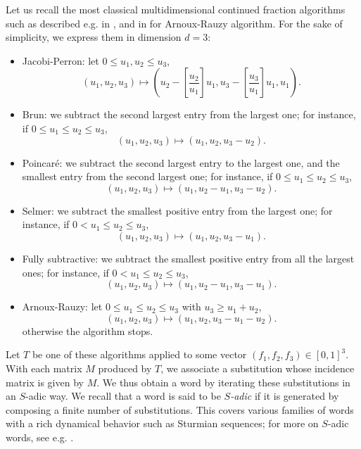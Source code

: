 \documentclass[preliminary,copyright,creativecommons]{eptcs}
\begin{document}
Let us  recall  the most classical multidimensional continued fraction algorithms      such    as  described e.g.  in \cite{schweiger}, and in \cite{CFZ,CFM,WZ} for Arnoux-Rauzy  algorithm.
For the sake of simplicity, we express them  in dimension $d=3$:
\begin{itemize}


\item   {Jacobi-Perron:}  let 
$0\leq u_1,u_2 \leq u_3$,
$$(u_1,u_2,u_3) \mapsto (u_2- [\frac{u_2}{u_1}] u_1, u_3- [\frac{u_3}{u_1}] u_1, u_1).$$
\item   {Brun: }
 we subtract the second largest entry from the largest one;   for instance, if  
   $0 \leq u_1\leq u_2 \leq u_3$,  
$$(u_1,u_2,u_3) \mapsto  (u_1, u_2, u_3 -u_2).$$


\item   {Poincar\'e:}  we subtract  the second largest entry to the largest one,  and   the smallest  entry  from the  second largest one; for instance, if 
$0 \leq u_1\leq u_2 \leq u_3$,
$$(u_1,u_2,u_3) \mapsto  (u_1, u_2-u_1, u_3 -u_2).$$


\item   {Selmer: }
 we subtract the smallest  positive entry   from the largest  one;   for instance, if   $0  < u_1\leq u_2 \leq u_3$,
$$(u_1,u_2,u_3) \mapsto  (u_1, u_2, u_3 -u_1).$$


\item   {Fully subtractive: }
we subtract the smallest   positive entry   from all  the largest  ones;   for instance, if 
  $0  <  u_1\leq u_2 \leq u_3$,
$$(u_1,u_2,u_3) \mapsto  (u_1, u_2-u_1, u_3 -u_1).$$

\item {Arnoux-Rauzy:}
let  $0 \leq u_1\leq u_2 \leq u_3$  with  $u_3 \geq u_1+u_2$,
$$(u_1,u_2,u_3) \mapsto  (u_1, u_2, u_3 -u_1 -u_2).$$
otherwise the algorithm stops.



\end{itemize}
Let $T$  be one of these   algorithms applied to  some vector $(f_1,f_2,f_3) \in [0,1]^3$.
With each matrix $M$ produced by  $T$, we associate  a substitution whose incidence matrix
is given by $M$.   We thus obtain a  word  by iterating these   substitutions in an $S$-adic way.
 We recall that a word  is said to be {\em  $S$-adic}  if it is generated by     composing   a  finite number of substitutions. This covers     various  families of  words
 with a rich   dynamical  behavior such as Sturmian sequences;  for more on $S$-adic words, see  e.g.  \cite{ABFogg,Durand}. 
 
\end{document}
